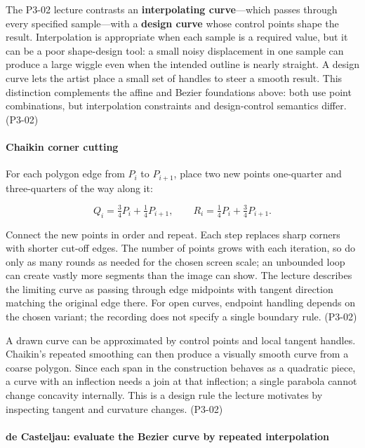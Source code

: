 The P3-02 lecture contrasts an \textbf{interpolating curve}---which passes through every specified sample---with a \textbf{design curve} whose control points shape the result. Interpolation is appropriate when each sample is a required value, but it can be a poor shape-design tool: a small noisy displacement in one sample can produce a large wiggle even when the intended outline is nearly straight. A design curve lets the artist place a small set of handles to steer a smooth result. This distinction complements the affine and Bezier foundations above: both use point combinations, but interpolation constraints and design-control semantics differ. (P3-02)

\paragraph{Chaikin corner cutting}\label{03-visual-computing-i-ch001-chaikin-corner-cutting}

For each polygon edge from \(P_i\) to \(P_{i+1}\), place two new points one-quarter and three-quarters of the way along it:

\[
Q_i=\tfrac34P_i+\tfrac14P_{i+1},\qquad
R_i=\tfrac14P_i+\tfrac34P_{i+1}.
\]

Connect the new points in order and repeat. Each step replaces sharp corners with shorter cut-off edges. The number of points grows with each iteration, so do only as many rounds as needed for the chosen screen scale; an unbounded loop can create vastly more segments than the image can show. The lecture describes the limiting curve as passing through edge midpoints with tangent direction matching the original edge there. For open curves, endpoint handling depends on the chosen variant; the recording does not specify a single boundary rule. (P3-02)

A drawn curve can be approximated by control points and local tangent handles. Chaikin's repeated smoothing can then produce a visually smooth curve from a coarse polygon. Since each span in the construction behaves as a quadratic piece, a curve with an inflection needs a join at that inflection; a single parabola cannot change concavity internally. This is a design rule the lecture motivates by inspecting tangent and curvature changes. (P3-02)

\paragraph{de Casteljau: evaluate the Bezier curve by repeated interpolation}\label{03-visual-computing-i-ch001-de-casteljau-evaluate-the-bezier-curve-by-repeated-interpolation}

